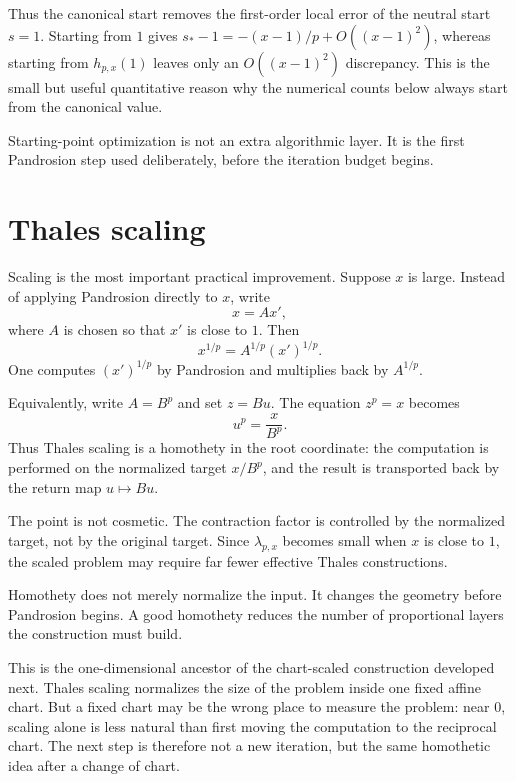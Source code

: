 \documentclass[10pt,a4paper]{article}
\theoremstyle{plain}
\theoremstyle{definition}
\theoremstyle{remark}
\newenvironment{takeaway}{%
  \begin{center}\begin{minipage}{0.92\linewidth}\small\itshape\color{blue!45!black}%
}{%
  \end{minipage}\end{center}%
}
\begin{document}
Thus the canonical start removes the first-order local error of the neutral
start $s=1$.  Starting from $1$ gives
$s_*-1=-(x-1)/p+O((x-1)^2)$, whereas starting from $h_{p,x}(1)$ leaves only an
$O((x-1)^2)$ discrepancy.  This is the small but useful quantitative reason why
the numerical counts below always start from the canonical value.

\begin{takeaway}
Starting-point optimization is not an extra algorithmic layer.  It is the first
Pandrosion step used deliberately, before the iteration budget begins.
\end{takeaway}


\section{Thales scaling}
\label{sec:scaling}

Scaling is the most important practical improvement.  Suppose $x$ is large.
Instead of applying Pandrosion directly to $x$, write
\begin{equation}
  x=A x',
  \label{eq:scaling-factor}
\end{equation}
where $A$ is chosen so that $x'$ is close to $1$.  Then
\[
  x^{1/p}=A^{1/p}(x')^{1/p}.
\]
One computes $(x')^{1/p}$ by Pandrosion and multiplies back by $A^{1/p}$.

Equivalently, write $A=B^p$ and set $z=Bu$.  The equation $z^p=x$ becomes
\[
  u^p=\frac{x}{B^p}.
\]
Thus Thales scaling is a homothety in the root coordinate: the computation is
performed on the normalized target $x/B^p$, and the result is transported back
by the return map $u\mapsto Bu$.

The point is not cosmetic.  The contraction factor is controlled by the
normalized target, not by the original target.  Since $\lambda_{p,x}$ becomes
small when $x$ is close to $1$, the scaled problem may require far fewer
effective Thales constructions.

\begin{takeaway}
Homothety does not merely normalize the input.  It changes the geometry before
Pandrosion begins.  A good homothety reduces the number of proportional layers
the construction must build.
\end{takeaway}

This is the one-dimensional ancestor of the chart-scaled construction developed
next.  Thales scaling normalizes the size of the problem inside one fixed
affine chart.  But a fixed chart may be the wrong place to measure the problem:
near $0$, scaling alone is less natural than first moving the computation to
the reciprocal chart.  The next step is therefore not a new iteration, but the
same homothetic idea after a change of chart.
\end{document}
